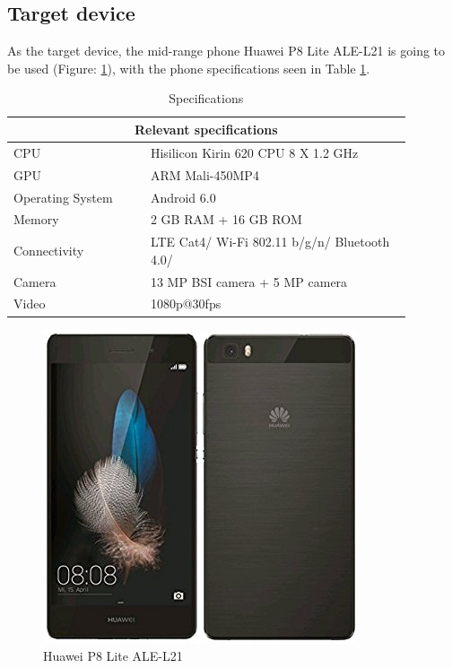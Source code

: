 \subsection{Target device}
As the target device, the mid-range phone Huawei P8 Lite ALE-L21 is going to be used (Figure: \ref{fig:p8lite}), with the phone specifications seen in Table \ref{table:specifications}.
\begin{table}[h]
	\begin{tabular}{|p{0.3\linewidth} || p{0.58\linewidth}|}
		\hline
		\multicolumn{2}{|c|}{Relevant specifications} \\
		\hline\hline
		CPU & Hisilicon Kirin 620 CPU 8 X 1.2 GHz \\
		\hline
		GPU & ARM Mali-450MP4 \\
		\hline
		Operating System & Android 6.0  \\
		\hline
		Memory & 2 GB RAM + 16 GB ROM \\
		\hline
		Connectivity & LTE Cat4/ Wi-Fi 802.11 b/g/n/ Bluetooth 4.0/ \\
		\hline
		Camera & 13 MP BSI camera + 5 MP camera\\
		\hline
		Video & 1080p@30fps \\
		\hline
	\end{tabular}
	\caption{Specifications\protect\footnotemark}
	\label{table:specifications}
\end{table}
\newpage
\begin{figure}[h]
	\centering
	\includegraphics[width=\linewidth]{images/p8lite.jpg}
	\caption{Huawei P8 Lite ALE-L21\protect\footnotemark}\label{fig:p8lite}
	\endminipage\hfill
\end{figure}

